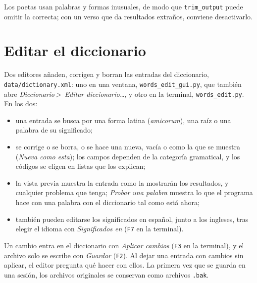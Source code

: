 \documentclass[12pt,
              article,
              oneside
              ]{memoir}
\newcommand*{\menu}[1]{\textit{#1}}
\newcommand*{\then}{\,>\,}
\newcommand*{\key}[1]{\texttt{#1}}
\begin{document}
\noindent{}%
Los poetas usan palabras y formas inusuales, de modo que
\texttt{trim\_output} puede omitir la correcta; con un verso que da
resultados extraños, conviene desactivarlo.

\section{Editar el diccionario}
\label{sec:editing}

%
Dos editores añaden, corrigen y borran las entradas del diccionario,
\texttt{data/dictionary.xml}: uno en una ventana,
\texttt{words\_edit\_gui.py}, que también abre \menu{Diccionario\then
Editar diccionario\ldots}, y otro en la terminal, \texttt{words\_edit.py}.
En los dos:

\begin{itemize}
\item una entrada se busca por una forma latina (\textit{amicorum}), una
  raíz o una palabra de su significado;
\item se corrige o se borra, o se hace una nueva, vacía o como la que se
  muestra (\menu{Nueva como esta}); los campos dependen de la categoría
  gramatical, y los códigos se eligen en listas que los explican;
\item la vista previa muestra la entrada como la mostrarán los
  resultados, y cualquier problema que tenga; \menu{Probar una palabra}
  muestra lo que el programa hace con una palabra con el diccionario tal
  como está ahora;
\item también pueden editarse los significados en español, junto a los
  ingleses, tras elegir el idioma con \menu{Significados en} (\key{F7} en
  la terminal).
\end{itemize}

%
Un cambio entra en el diccionario con \menu{Aplicar cambios} (\key{F3} en
la terminal), y el archivo solo se escribe con \menu{Guardar} (\key{F2}).
Al dejar una entrada con cambios sin aplicar, el editor pregunta qué hacer
con ellos. La primera vez que se guarda en una sesión, los archivos
originales se conservan como archivos \texttt{.bak}.
\end{document}
